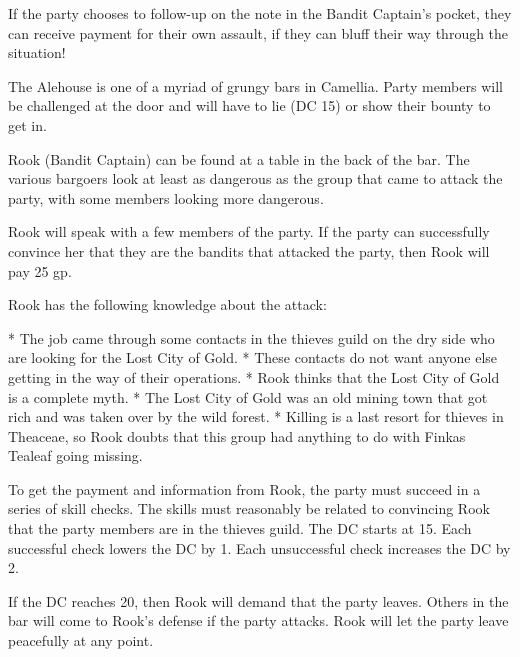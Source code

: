 If the party chooses to follow-up on the note in the Bandit Captain's pocket, they can receive payment for their own assault, if they can bluff their way through the situation!

The Alehouse is one of a myriad of grungy bars in Camellia.
Party members will be challenged at the door and will have to lie (DC 15) or show their bounty to get in.

Rook (Bandit Captain) can be found at a table in the back of the bar.
The various bargoers look at least as dangerous as the group that came to attack the party, with some members looking more dangerous.

Rook will speak with a few members of the party.
If the party can successfully convince her that they are the bandits that attacked the party, then Rook will pay 25 gp.

Rook has the following knowledge about the attack:

* The job came through some contacts in the thieves guild on the dry side who are looking for the Lost City of Gold.
* These contacts do not want anyone else getting in the way of their operations.
* Rook thinks that the Lost City of Gold is a complete myth.
* The Lost City of Gold was an old mining town that got rich and was taken over by the wild forest.
* Killing is a last resort for thieves in Theaceae, so Rook doubts that this group had anything to do with Finkas Tealeaf going missing.

To get the payment and information from Rook, the party must succeed in a series of skill checks.
The skills must reasonably be related to convincing Rook that the party members are in the thieves guild.
The DC starts at 15.
Each successful check lowers the DC by 1.
Each unsuccessful check increases the DC by 2.

If the DC reaches 20, then Rook will demand that the party leaves.
Others in the bar will come to Rook's defense if the party attacks.
Rook will let the party leave peacefully at any point.
